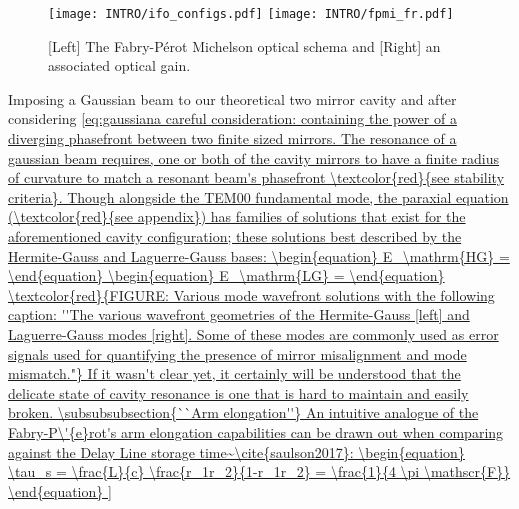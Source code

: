 \begin{figure}[ht!]
  \begin{subcaptiongroup}{\texttt{[image: INTRO/ifo\_configs.pdf]}}
  \texttt{[image: INTRO/fpmi\_fr.pdf]}
  \end{subcaptiongroup}
  \hfill
  \caption{[Left] The Fabry-P\'{e}rot Michelson optical schema and [Right] an associated optical gain.}
  \label{fig:fpmi}
\end{figure}

Imposing a Gaussian beam to our theoretical two mirror cavity and after considering \ref{eq:gaussiana careful consideration: containing the power of a diverging phasefront between two finite sized mirrors. The resonance of a gaussian beam requires, one or both of the cavity mirrors to have a finite radius of curvature to match a resonant beam's phasefront \textcolor{red}{see stability criteria}. Though alongside the TEM00 fundamental mode, the paraxial equation (\textcolor{red}{see appendix}) has families of solutions that exist for the aforementioned cavity configuration; these solutions best described by the Hermite-Gauss and Laguerre-Gauss bases:

\begin{equation}
	E_\mathrm{HG} = 
\end{equation}


\begin{equation}
	E_\mathrm{LG} = 
\end{equation}

\textcolor{red}{FIGURE: Various mode wavefront solutions with the following caption: ''The various wavefront geometries of the Hermite-Gauss [left] and Laguerre-Gauss modes [right]. Some of these modes are commonly used as error signals used for quantifying the presence of mirror misalignment and mode mismatch."}

If it wasn't clear yet, it certainly will be understood that the delicate state of cavity resonance is one that is hard to maintain and easily broken.  

\subsubsubsection{``Arm elongation''}

An intuitive analogue of the Fabry-P\'{e}rot's arm elongation capabilities can be drawn out when comparing against the Delay Line storage time~\cite{saulson2017}:

\begin{equation}
	\tau_s = \frac{L}{c} \frac{r_1r_2}{1-r_1r_2} = \frac{1}{4 \pi \mathscr{F}}
\end{equation}

}

